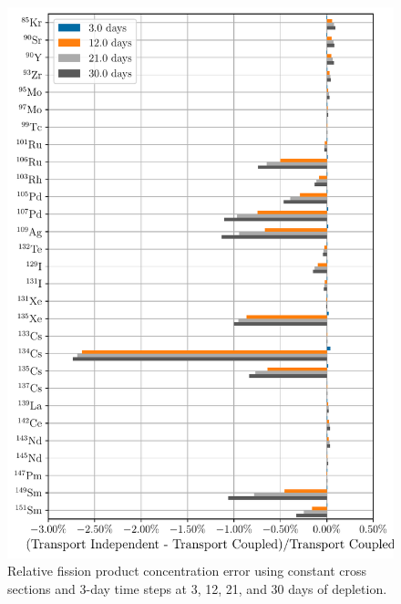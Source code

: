     \begin{figure}[h!tpb]
        \centering
        \includegraphics[width=\linewidth]{figs/fission_products_constant_xs_predictor_fission_q_days.pdf}
        \caption{Relative fission product concentration error using constant
        cross sections and 3-day time steps at 3, 12, 21, and 30 days of
        depletion.}
        \label{fig:fp-error-constant-xs-days}
    \end{figure}

